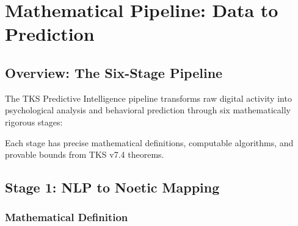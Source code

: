 \documentclass[11pt,twoside]{book}
\begin{document}
\part{Mathematical Pipeline: Data to Prediction}

\chapter{Overview: The Six-Stage Pipeline}
\label{ch:pipeline-overview}

\begin{tcolorbox}[colback=blue!5!white,colframe=blue!75!black,title=\textbf{Pipeline Architecture},breakable]
The TKS Predictive Intelligence pipeline transforms raw digital activity into psychological analysis and behavioral prediction through six mathematically rigorous stages:

\begin{center}
\end{center}

Each stage has precise mathematical definitions, computable algorithms, and provable bounds from TKS v7.4 theorems.
\end{tcolorbox}

\chapter{Stage 1: NLP to Noetic Mapping}
\label{ch:stage1-nlp}

\section{Mathematical Definition}
\end{document}
